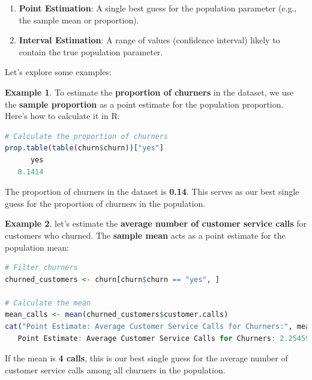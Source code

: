 \documentclass[
]{book}
\providecommand{\tightlist}{%
  \setlength{\itemsep}{0pt}\setlength{\parskip}{0pt}}
\theoremstyle{definition}
\theoremstyle{definition}
\newtheorem{example}{Example}[chapter]
\theoremstyle{definition}
\theoremstyle{definition}
\theoremstyle{remark}
\begin{document}
\begin{enumerate}
\def\labelenumi{\arabic{enumi}.}
\tightlist
\item
  \textbf{Point Estimation}: A single best guess for the population parameter (e.g., the sample mean or proportion).\\
\item
  \textbf{Interval Estimation}: A range of values (confidence interval) likely to contain the true population parameter.
\end{enumerate}

Let's explore some examples:

\begin{example}
\protect\hypertarget{exm:ex-est-churn-proportion}{}\label{exm:ex-est-churn-proportion}To estimate the \textbf{proportion of churners} in the dataset, we use the \textbf{sample proportion} as a point estimate for the population proportion. Here's how to calculate it in R:

\begin{lstlisting}[language=R]
# Calculate the proportion of churners
prop.table(table(churn$churn))["yes"]
      yes 
   0.1414
\end{lstlisting}

The proportion of churners in the dataset is \textbf{0.14}. This serves as our best single guess for the proportion of churners in the population.
\end{example}

\begin{example}
\protect\hypertarget{exm:ex-est-service-call}{}\label{exm:ex-est-service-call}let's estimate the \textbf{average number of customer service calls} for customers who churned. The \textbf{sample mean} acts as a point estimate for the population mean:

\begin{lstlisting}[language=R]
# Filter churners
churned_customers <- churn[churn$churn == "yes", ]

# Calculate the mean
mean_calls <- mean(churned_customers$customer.calls)
cat("Point Estimate: Average Customer Service Calls for Churners:", mean_calls)
   Point Estimate: Average Customer Service Calls for Churners: 2.254597
\end{lstlisting}

If the mean is \textbf{4 calls}, this is our best single guess for the average number of customer service calls among all churners in the population.
\end{example}
\end{document}
